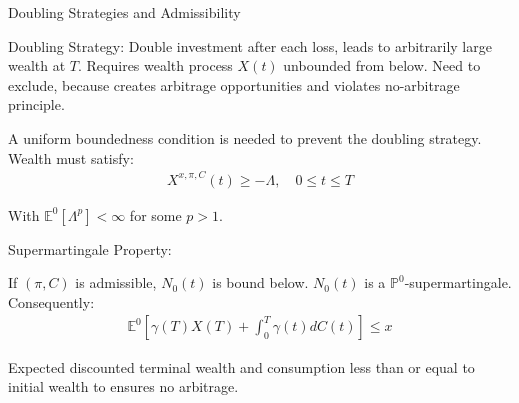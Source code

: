 \documentclass{beamer}
\begin{document}
\begin{frame}{Doubling Strategies and Admissibility}

    {\footnotesize \footnotesize
    \par Doubling Strategy: Double investment after each loss, leads to arbitrarily large wealth at $T$. 
    Requires wealth process $X(t)$ unbounded from below. Need to exclude, because creates arbitrage opportunities and 
    violates no-arbitrage principle.
    \vspace{1em}
    \par A uniform boundedness condition is needed to prevent the doubling strategy. Wealth must satisfy:
    \begin{align*}
        X^{x,\pi,C}(t) \geq -\Lambda, \quad 0 \leq t \leq T
    \end{align*}
    \par  With $\mathbb{E}^0[\Lambda^p] < \infty$ for some $p > 1$.
    \vspace{1em}
    \par   \pause Supermartingale Property:
    \vspace{1em}
    \par If $(\pi,C)$ is admissible, $N_0(t)$ is bound below.  $N_0(t)$ is a $\mathbb{P}^0$-supermartingale. Consequently:
    \begin{align*}
          \mathbb{E}^0 \left[ \gamma(T)X(T) + \int_0^T \gamma(t)dC(t) \right] \leq x
    \end{align*}
    \par  Expected discounted terminal wealth and consumption less than or equal to initial wealth to ensures no arbitrage.
    }
\end{frame} 
\end{document}
